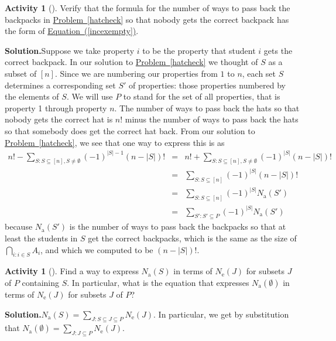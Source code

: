 \documentclass[10pt,]{book}
\theoremstyle{plain}
\theoremstyle{definition}
\newtheorem{activity}[project]{Activity}
\numberwithin{equation}{chapter}
\newcommand{\amp}{&}
\begin{document}
\begin{activity}[]\label{activity-106}
Verify that the formula for the number of ways to pass back the backpacks in \hyperref[hatcheck]{Problem~\ref{hatcheck}} so that nobody gets the correct backpack has the form of \hyperref[incexempty]{Equation~(\ref{incexempty})}.%
\par\medskip\noindent%
\textbf{Solution.}\quad Suppose we take property \(i\) to be the property that student \(i\) gets the correct backpack. In our solution to \hyperref[hatcheck]{Problem~\ref{hatcheck}} we thought of \(S\) as a subset of \([n]\). Since we are numbering our properties from \(1\) to \(n\), each set \(S\) determines a corresponding set \(S'\) of properties: those properties numbered by the elements of \(S\). We will use \(P\) to stand for the set of all properties, that is property 1 through property \(n\). The number of ways to pass back the hats so that nobody gets the correct hat is \(n!\) minus the number of ways to pass back the hats so that somebody does get the correct hat back. From our solution to \hyperref[hatcheck]{Problem~\ref{hatcheck}}, we see that one way to express this is as%
\begin{align*}
n!-\sum_{S:
S\subseteq [n], S\not=\emptyset}(-1)^{|S|-1} (n-|S|)!\amp =\amp
n!+\sum_{S:
S\subseteq [n], S\not=\emptyset}(-1)^{|S|} (n-|S|)!\\
\amp =\amp
\sum_{S:
S\subseteq [n]}(-1)^{|S|} (n-|S|)!\\
\amp =\amp \sum_{S:
S\subseteq [n]}(-1)^{|S|} N_{\mbox{a} }(S')\\
\amp =\amp
\sum_{S':
S'\subseteq P}(-1)^{|S|} N_{\mbox{a} }(S')
\end{align*}
because \(N_{\mbox{a} }(S')\) is the number of ways to pass back the backpacks so that at least the students in \(S\) get the correct backpacks, which is the same as the size of \(\bigcap_{i:i\in S} A_i\), and which we computed to be \((n-|S|)!\).%
\end{activity}
\begin{activity}[]\label{incexsystemeq}
Find a way to express \(N_{\mbox{a} }(S)\) in terms of \(N_{\mbox{e} }(J)\) for subsets \(J\) of \(P\) containing \(S\). In particular, what is the equation that expresses \(N_{\mbox{a} }(\emptyset)\) in terms of \(N_{\mbox{e} }(J)\) for subsets \(J\) of \(P\)?%
\par\medskip\noindent%
\textbf{Solution.}\quad \(N_{\mbox{a} }(S) = \sum_{J: S\subseteq
J\subseteq P}N_{\mbox{e} }(J)\). In particular, we get by substitution that \(N_{\mbox{a} }(\emptyset)=\sum_{J:J\subseteq P} N_{\mbox{e} }(J)\).%
\end{activity}
\end{document}
